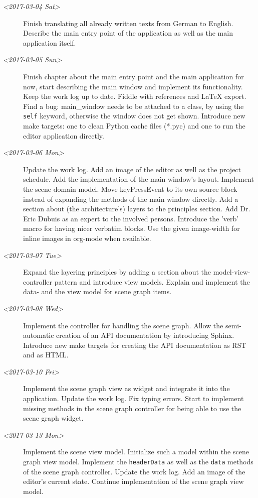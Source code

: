 \documentclass[10pt, openright, notitlepage]{scrreprt}
\begin{document}
\begin{description}
\item[{\textit{<2017-03-04 Sat>}}] Finish translating all already written texts from German
to English. Describe the main entry point of the application as well as the
main application itself.

\item[{\textit{<2017-03-05 Sun>}}] Finish chapter about the main entry point and the main
application for now, start describing the main window and implement its
functionality. Keep the work log up to date. Fiddle with references and
\LaTeX{} export. Find a bug: main\_window needs to be attached to a class, by
using the \texttt{self} keyword, otherwise the window does not get shown.
Introduce new make targets: one to clean Python cache files (*.pyc) and one
to run the editor application directly.

\item[{\textit{<2017-03-06 Mon>}}] Update the work log. Add an image of the editor as well as
the project schedule. Add the implementation of the main window's layout.
Implement the scene domain model. Move keyPressEvent to its own source
block instead of expanding the methods of the main window directly. Add a
section about (the architecture's) layers to the principles section. Add
Dr. Eric Dubuis as an expert to the involved persons. Introduce the 'verb'
macro for having nicer verbatim blocks. Use the given image-width for
inline images in org-mode when available.

\item[{\textit{<2017-03-07 Tue>}}] Expand the layering principles by adding a section about
the model-view-controller pattern and introduce view models. Explain and
implement the data- and the view model for scene graph items.

\item[{\textit{<2017-03-08 Wed>}}] Implement the controller for handling the scene graph.
Allow the semi-automatic creation of an API documentation by introducing
Sphinx. Introduce new make targets for creating the API documentation as
RST and as HTML.

\item[{\textit{<2017-03-10 Fri>}}] Implement the scene graph view as widget and integrate it
into the application. Update the work log. Fix typing errors. Start to
implement missing methods in the scene graph controller for being able to
use the scene graph widget.

\item[{\textit{<2017-03-13 Mon>}}] Implement the scene view model. Initialize such a model
within the scene graph view model. Implement the \texttt{headerData} as well as
the \texttt{data} methods of the scene graph controller. Update the work log. Add
an image of the editor's current state. Continue implementation of the
scene graph view model.


\end{description}
\end{document}
